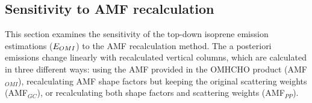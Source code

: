 
    

    \subsection{Sensitivity to AMF recalculation}
      \label{BioIsop:uncertainty:recalc}
      
      This section examines the sensitivity of the top-down isoprene emission estimations ($E_{OMI}$) to the AMF recalculation method.
      The a posteriori emissions change linearly with recalculated vertical columns, which are calculated in three different ways: using the AMF provided in the OMHCHO product (AMF$_{OMI}$), recalculating AMF shape factors but keeping the original scattering weights (AMF$_{GC}$), or recalculating both shape factors and scattering weights (AMF$_{PP}$).
      
